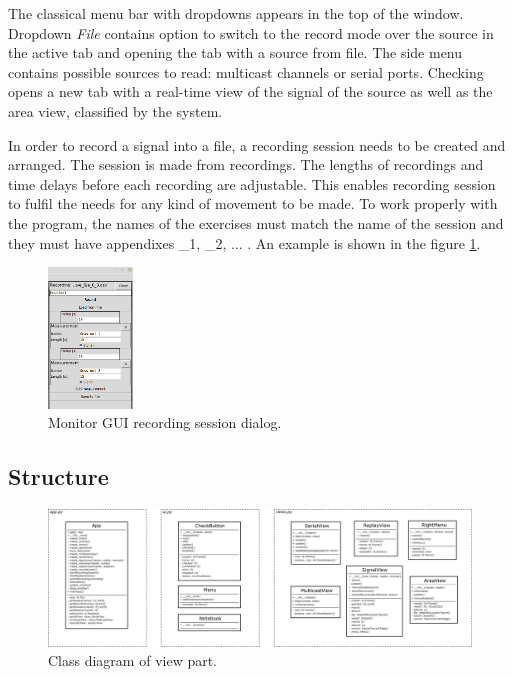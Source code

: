 The classical menu bar with dropdowns appears in the top of the window. Dropdown {\it File} contains
option to switch to the record mode over the source in the active tab and opening the tab with a
source from file.
The side menu contains possible sources to read: multicast channels or serial ports. Checking
opens a new tab with a real-time view of the signal of the source as well as the area view,
classified by the system. 

In order to record a signal into a file, a recording session needs to be created and arranged.
The session is made from recordings. The lengths of recordings and time delays before each recording
are adjustable. This enables recording session to fulfil the needs for any kind of movement to be made.
To work properly with the program, the names of the exercises must match the name of the session and they
must have appendixes \_1, \_2, ... . An example is shown in the figure \ref{fig:monitorRecordGUI}.

\begin{figure}[!ht]
\begin{center}
\includegraphics[width=0.2\textwidth]{render/record.png}
\caption{Monitor GUI recording session dialog.\label{fig:monitorRecordGUI}}
\end{center}
\end{figure}

\subsection*{Structure}

\begin{figure}[h!]
\begin{center}
\includegraphics[width=1\textwidth]{img/class_gui.png}
\caption{Class diagram of view part. \label{fig:classGUI}}
\end{center}
\end{figure}

